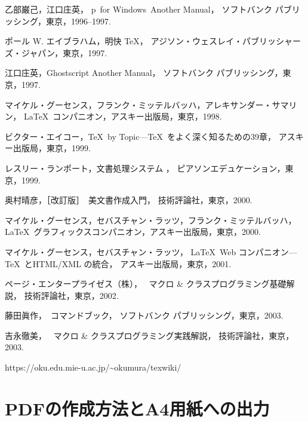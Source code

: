 \documentclass[technicalreport]{ieicej}
\begin{document}
\begin{thebibliography}{99}
乙部巌己，江口庄英，
p\LaTeXe\ for Windows\ Another Manual，
ソフトバンク パブリッシング，東京，1996--1997. 

ポール W. エイブラハム，明快 \TeX{}，
アジソン・ウェスレイ・パブリッシャーズ・ジャパン，東京，1997. 

江口庄英，Ghostscript Another Manual，
ソフトバンク パブリッシング，東京，1997. 

マイケル・グーセンス，フランク・ミッテルバッハ，アレキサンダー・サマリン，
\LaTeX\ コンパニオン，アスキー出版局，東京，1998. 

ビクター・エイコー，\TeX\ by Topic---\TeX\ をよく深く知るための39章，
アスキー出版局，東京，1999. 

レスリー・ランポート，文書処理システム \LaTeXe{}，
ピアソンエデュケーション，東京，1999. 

奥村晴彦，［改訂版］\LaTeXe\ 美文書作成入門，
技術評論社，東京，2000. 

マイケル・グーセンス，セバスチャン・ラッツ，フランク・ミッテルバッハ，
\LaTeX\ グラフィックスコンパニオン，アスキー出版局，東京，2000. 

マイケル・グーセンス，セバスチャン・ラッツ，
\LaTeX\ Web コンパニオン---\TeX\ とHTML/XML の統合，
アスキー出版局，東京，2001. 

ページ・エンタープライゼス\<（株）\<，
\LaTeXe\ マクロ \& クラスプログラミング基礎解説，
技術評論社，東京，2002. 

藤田眞作，\LaTeXe\ コマンドブック，
ソフトバンク パブリッシング，東京，2003. 

吉永徹美，
\LaTeXe\ マクロ \& クラスプログラミング実践解説，
技術評論社，東京，2003. 

https://oku.edu.mie-u.ac.jp/\~{}okumura/texwiki/
\end{thebibliography}

\appendix
\section{PDFの作成方法とA4用紙への出力}
\end{document}
